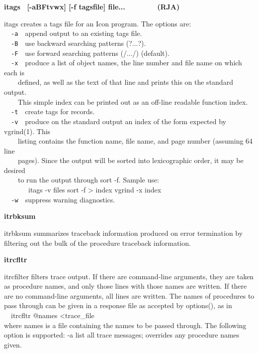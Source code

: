 {{\sffamily\bfseries
itags \ \textrm{\textmd{[-aBFtvwx] [-f tagsfile]
file...\ \ \ \ \ \ \ \ }}(RJA)}

\textsf{itags} creates a tags file for an Icon program. The options
are:\\
\ \ \texttt{{}-a}\ \ append output to an existing tags file.\\
\ \ \texttt{{}-B}\ \ use backward searching patterns (?...?).\\
\ \ \texttt{{}-F}\ \ use forward searching patterns (/.../)
(default).\\
\ \ \texttt{{}-x}\ \ produce a list of object names, the line number and
file name on which each is\\
\ \ \ \ defined, as well as the text of that line and prints this on the
standard output.\\
\ \ \ \ This simple index can be printed out as an off-line readable
function index.\\
\ \ \texttt{{}-t}\ \ create tags for records.\\
\ \ \texttt{{}-v}\ \ produce on the standard output an index of the form
expected by vgrind(1). This\\
\ \ \ \ listing contains the function name, file name, and page number
(assuming 64 line\\
\ \ \ \ pages). Since the output will be sorted into lexicographic
order, it may be desired\\
\ \ \ \ to run the output through sort -f. Sample use:\\
\ \ \ \  \ \ \ \textsf{itags -v files {\textbar} sort -f {\textgreater}
index vgrind -x index}\texttt{\\
\ \ {}-w}\ \ suppress warning diagnostics.

{\sffamily\bfseries
itrbksum\ \ \ \ \ \ \ \ \ \ \ \ \ \ \ \ \ \ \ \ }

\textsf{itrbksum} summarizes traceback information produced on error
termination by filtering out the bulk of the procedure traceback
information.

{\sffamily\bfseries
itrcfltr\ \ \ \ \ \ \ \ \ \ \ \ \ \ \ \ \ \ \ \ \ \ }

\textsf{itrcfilter} filters trace output. If there are command-line
arguments, they are taken as procedure names, and only those lines with
those names are written. If there are no command-line arguments, all
lines are written. The names of procedures to pass through can be given
in a {\textquotedbl}response{\textquotedbl} file as accepted by
\textsf{options()}, as in\\
\ \ \textsf{itrcfltr @names {\textless}trace\_file}\\
where \textsf{names} is a file containing the names to be passed
through. The following option is supported: \textsf{{}-a} list all
trace messages; overrides any procedure names given.

}
